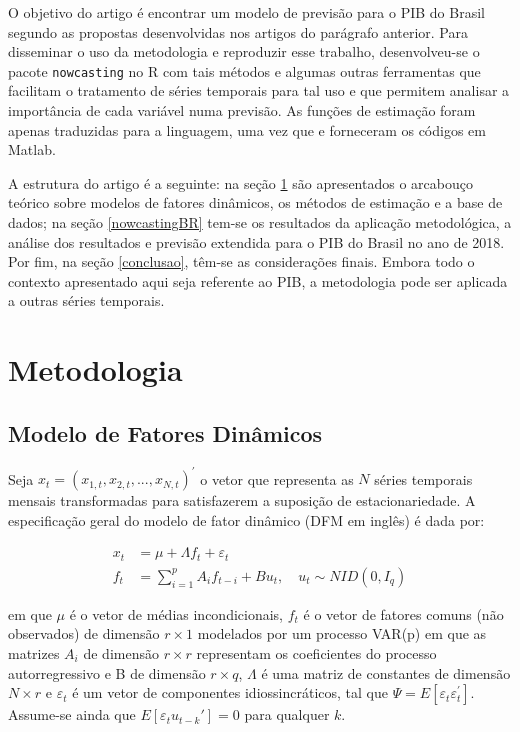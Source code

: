 \documentclass{article}
\begin{document}
O objetivo do artigo é encontrar um modelo de previsão para o PIB do Brasil segundo as propostas desenvolvidas nos artigos do parágrafo anterior. Para disseminar o uso da metodologia e reproduzir esse trabalho, desenvolveu-se o pacote \texttt{nowcasting} no \textsf{R} com tais métodos e algumas outras ferramentas que facilitam o tratamento de séries temporais para tal uso e que permitem analisar a importância de cada variável numa previsão. As funções de estimação foram apenas traduzidas para a linguagem, uma vez que \cite{giannoneetal2008} e \cite{banburaetal2011} forneceram os códigos em \textsf{Matlab}.

A estrutura do artigo é a seguinte: na seção \ref{metodo} são apresentados o arcabouço teórico sobre modelos de fatores dinâmicos, os métodos de estimação e a base de dados; na seção \ref{nowcastingBR} tem-se os resultados da aplicação metodológica, a análise dos resultados e previsão extendida para o PIB do Brasil no ano de 2018. Por fim, na seção \ref{conclusao}, têm-se as considerações finais. Embora todo o contexto apresentado aqui seja referente ao PIB, a metodologia pode ser aplicada a outras séries temporais.

\section{Metodologia}\label{metodo}

\subsection{Modelo de Fatores Dinâmicos}\label{DFMmodel}

Seja $x_t = (x_{1,t},x_{2,t}, ..., x_{N,t})^{'}$ o vetor que representa as $N$ séries temporais mensais transformadas para satisfazerem a suposição de estacionariedade. A especificação geral do modelo de fator dinâmico (DFM em inglês) é dada por:

\begin{align}
x_t   &= \mu + \Lambda f_t + \varepsilon_t \label{eq_xt} \\
f_{t} &= \sum_{i=1}^{p} A_i f_{t-i} + B u_t, \quad u_t \sim NID(0,I_q) \label{eq_ft}
\end{align}

em que $\mu$ é o vetor de médias incondicionais, $f_t$ é o vetor de fatores comuns (não observados) de dimensão $r \times 1$ modelados por um processo VAR(p) em que as matrizes $A_i$ de dimensão $r \times r$ representam os coeficientes do processo autorregressivo e B de dimensão $r \times q$, $\Lambda$ é uma matriz de constantes de dimensão $N \times r$ e $\varepsilon_t$ é um vetor de componentes idiossincráticos, tal que $\Psi = E[\varepsilon_{t} \varepsilon^{'}_{t}]$. Assume-se ainda que $E[\varepsilon_t u_{t-k}'] = 0$ para qualquer $k$. %
\end{document}
